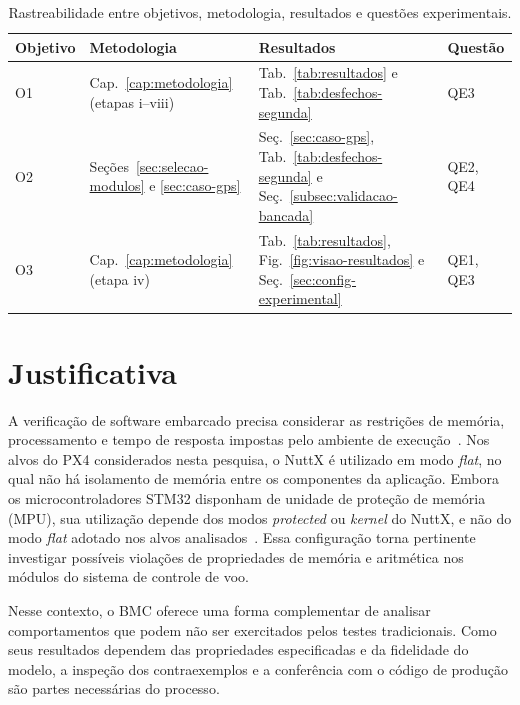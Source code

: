 \begin{table}[H]
\centering
\caption[Rastreabilidade entre objetivos, metodologia, resultados e questões]{Rastreabilidade entre objetivos, metodologia, resultados e questões experimentais.}
\label{tab:rastreabilidade}
\footnotesize
\begin{tabular}{@{}llll@{}}
\toprule
\textbf{Objetivo} & \textbf{Metodologia} &
\textbf{Resultados} & \textbf{Questão} \\
\midrule
O1 & Cap.~\ref{cap:metodologia} (etapas i--viii) &
Tab.~\ref{tab:resultados} e Tab.~\ref{tab:desfechos-segunda} & QE3 \\
O2 & Seções~\ref{sec:selecao-modulos} e
\ref{sec:caso-gps} &
Seç.~\ref{sec:caso-gps}, Tab.~\ref{tab:desfechos-segunda} e Seç.~\ref{subsec:validacao-bancada} & QE2, QE4 \\
O3 & Cap.~\ref{cap:metodologia} (etapa iv) &
Tab.~\ref{tab:resultados}, Fig.~\ref{fig:visao-resultados} e Seç.~\ref{sec:config-experimental} & QE1, QE3 \\
\bottomrule
\end{tabular}
\end{table}

\section{Justificativa}
\label{sec:justificativa}

A verificação de software embarcado precisa considerar as restrições de memória, processamento e tempo de resposta impostas pelo ambiente de execução~\cite{Mzid2024}. Nos alvos do PX4 considerados nesta pesquisa, o NuttX é utilizado em modo \textit{flat}, no qual não há isolamento de memória entre os componentes da aplicação. Embora os microcontroladores STM32 disponham de unidade de proteção de memória (MPU), sua utilização depende dos modos \textit{protected} ou \textit{kernel} do NuttX, e não do modo \textit{flat} adotado nos alvos analisados~\cite{NuttX}. Essa configuração torna pertinente investigar possíveis violações de propriedades de memória e aritmética nos módulos do sistema de controle de voo.

Nesse contexto, o BMC oferece uma forma complementar de analisar comportamentos que podem não ser exercitados pelos testes tradicionais. Como seus resultados dependem das propriedades especificadas e da fidelidade do modelo, a inspeção dos contraexemplos e a conferência com o código de produção são partes necessárias do processo.

